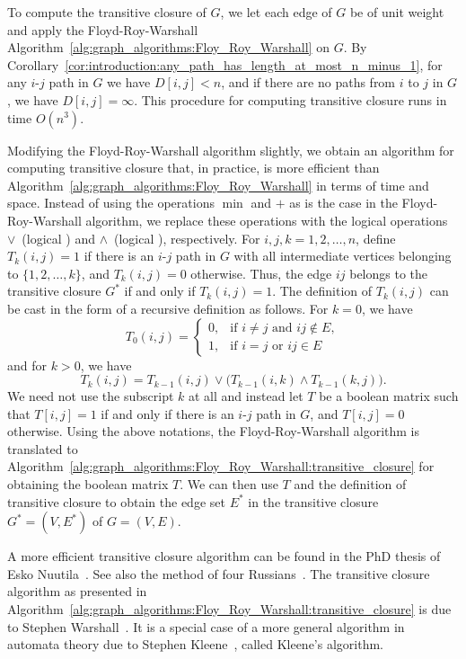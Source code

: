 To compute the transitive closure of $G$, we let each edge of $G$ be
of unit weight and apply the
Floyd-Roy-Warshall
Algorithm~\ref{alg:graph_algorithms:Floy_Roy_Warshall} on $G$. By
Corollary~\ref{cor:introduction:any_path_has_length_at_most_n_minus_1},
for any $i$-$j$ path in $G$ we have $D[i,j] < n$, and if there are no
paths from $i$ to $j$ in $G$, we have $D[i,j] = \infty$. This
procedure for computing transitive closure runs in time $O(n^3)$.

Modifying the Floyd-Roy-Warshall
algorithm slightly, we obtain an
algorithm for computing transitive closure
that, in practice, is more efficient than
Algorithm~\ref{alg:graph_algorithms:Floy_Roy_Warshall} in terms of
time and space. Instead of using the operations $\min$ and $+$ as is
the case in the Floyd-Roy-Warshall
algorithm, we replace these
operations with the logical operations $\vee$~(logical \OR) and
$\wedge$~(logical \AND), respectively. For $i,j,k = 1, 2, \dots, n$,
define $T_k(i,j) = 1$ if there is an $i$-$j$ path in $G$ with all
intermediate vertices belonging to $\{1, 2, \dots, k\}$, and
$T_k(i,j) = 0$ otherwise. Thus, the edge $ij$ belongs to the
transitive closure $G^*$ if and only if $T_k(i,j) = 1$. The definition
of $T_k(i,j)$ can be cast in the form of a recursive definition as
follows. For $k = 0$, we have
\[
T_0(i,j)
=
\begin{cases}
0, & \text{if $i \neq j$ and $ij \notin E$}, \\
1, & \text{if $i = j$ or $ij \in E$}
\end{cases}
\]
and for $k > 0$, we have
\[
T_k(i,j)
=
T_{k-1}(i,j) \vee \big( T_{k-1}(i,k) \wedge T_{k-1}(k,j) \big).
\]
We need not use the subscript $k$ at all and instead let $T$ be a
boolean matrix such that $T[i,j] = 1$ if and only if there is an
$i$-$j$ path in $G$, and $T[i,j] = 0$ otherwise. Using the above
notations, the Floyd-Roy-Warshall
algorithm is translated to
Algorithm~\ref{alg:graph_algorithms:Floy_Roy_Warshall:transitive_closure}
for obtaining the boolean matrix $T$. We can then use $T$ and the
definition of transitive closure to obtain
the edge set $E^*$ in the transitive closure $G^* = (V, E^*)$ of
$G = (V, E)$.

A more efficient transitive closure algorithm can be found in the PhD
thesis of Esko Nuutila~\cite{Nuutila1995}. See
also the method of four Russians~\cite{AhoEtAl1974,ArlazarovEtAl1970}. The
transitive closure algorithm as presented in
Algorithm~\ref{alg:graph_algorithms:Floy_Roy_Warshall:transitive_closure}
is due to Stephen
Warshall~\cite{Warshall1962}. It is a special
case of a more general algorithm in automata
theory due to Stephen
Kleene~\cite{Kleene1956}, called Kleene's
algorithm.

